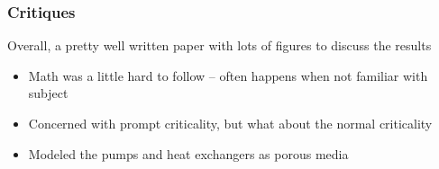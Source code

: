 \begin{frame}
  \frametitle{Critiques}
  Overall, a pretty well written paper with lots of figures to discuss the results
  \begin{itemize}
  \item Math was a little hard to follow -- often happens when not familiar with subject

  \item Concerned with prompt criticality, but what about the normal criticality
  \item Modeled the pumps and heat exchangers as porous media
  \end{itemize}
\end{frame}


